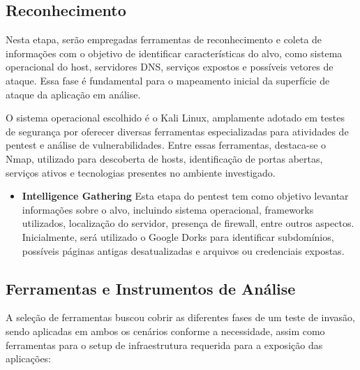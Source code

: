 \documentclass[12pt]{article}
\begin{document}
\subsection{Reconhecimento}

Nesta etapa, serão empregadas ferramentas de reconhecimento e coleta de informações com o objetivo de identificar características do alvo, como sistema operacional do host, 
servidores DNS, serviços expostos e possíveis vetores de ataque. Essa fase é fundamental para o mapeamento inicial da superfície de ataque da aplicação em análise.

O sistema operacional escolhido é o Kali Linux, amplamente adotado em testes de segurança por oferecer diversas ferramentas especializadas para atividades de pentest e 
análise de vulnerabilidades. Entre essas ferramentas, destaca-se o Nmap, utilizado para descoberta de hosts, identificação de portas abertas, serviços ativos e tecnologias 
presentes no ambiente investigado.

\begin{itemize}
    \item \textbf{Intelligence Gathering} Esta etapa do pentest tem como objetivo levantar informações sobre o alvo, incluindo sistema operacional, frameworks utilizados, 
    localização do servidor, presença de firewall, entre outros aspectos. Inicialmente, será utilizado o Google Dorks para identificar subdomínios, possíveis páginas 
    antigas desatualizadas e arquivos ou credenciais expostas.
\end{itemize}

\subsection{Ferramentas e Instrumentos de Análise}

A seleção de ferramentas buscou cobrir as diferentes fases de um teste de invasão, sendo aplicadas em ambos os cenários conforme a necessidade, assim como ferramentas para 
o setup de infraestrutura requerida para a exposição das aplicações:
\end{document}
